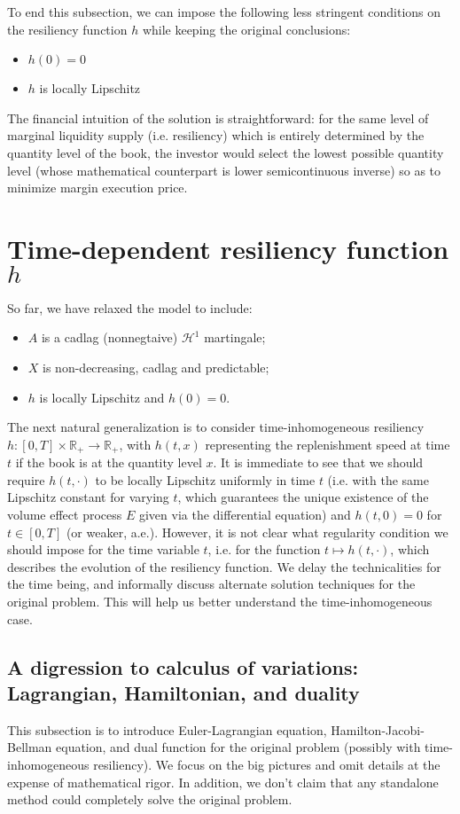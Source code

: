 \documentclass[openany,oneside]{article}
\theoremstyle{definition}
\theoremstyle{remark}
\begin{document}
To end this subsection, we can impose the following less stringent conditions on the resiliency function $h$ while keeping the original conclusions:
\begin{itemize}
\item $h(0)=0$
\item $h$ is locally Lipschitz
\end{itemize}
The financial intuition of the solution is straightforward: for the same level of marginal liquidity supply (i.e. resiliency) which is entirely determined by the quantity level of the book, the investor would select the lowest possible quantity level (whose mathematical counterpart is lower semicontinuous inverse) so as to minimize margin execution price.


\section{Time-dependent resiliency function $h$}
So far, we have relaxed the model to include:
\begin{itemize}
\item $A$ is a cadlag (nonnegtaive) $\mathcal{H}^1$ martingale;
\item $X$ is non-decreasing, cadlag and predictable;
\item $h$ is locally Lipschitz and $h(0)=0$.
\end{itemize}

The next natural generalization is to consider time-inhomogeneous resiliency $h:[0,T]\times \mathbb{R}_+ \to \mathbb{R}_+$, with $h(t,x)$ representing the replenishment speed at time $t$ if the book is at the quantity level $x$. It is immediate to see that we should require $h(t,\cdot)$ to be locally Lipschitz uniformly in time $t$ (i.e. with the same Lipschitz constant for varying $t$, which guarantees the unique existence of the volume effect process $E$ given via the differential equation) and $h(t,0)=0$ for $t\in[0,T]$ (or weaker, a.e.). However, it is not clear what regularity condition we should impose for the time variable $t$, i.e. for the function $t\mapsto h(t,\cdot)$, which describes the evolution of the resiliency function. We delay the technicalities for the time being, and informally discuss alternate solution techniques for the original problem. This will help us better understand the time-inhomogeneous case.

\subsection{A digression to calculus of variations: Lagrangian, Hamiltonian, and duality}
This subsection is to introduce Euler-Lagrangian equation, Hamilton-Jacobi-Bellman equation, and dual function for the original problem (possibly with time-inhomogeneous resiliency). We focus on the big pictures and omit details at the expense of mathematical rigor. In addition, we don't claim that any standalone method could completely solve the original problem.
\end{document}
